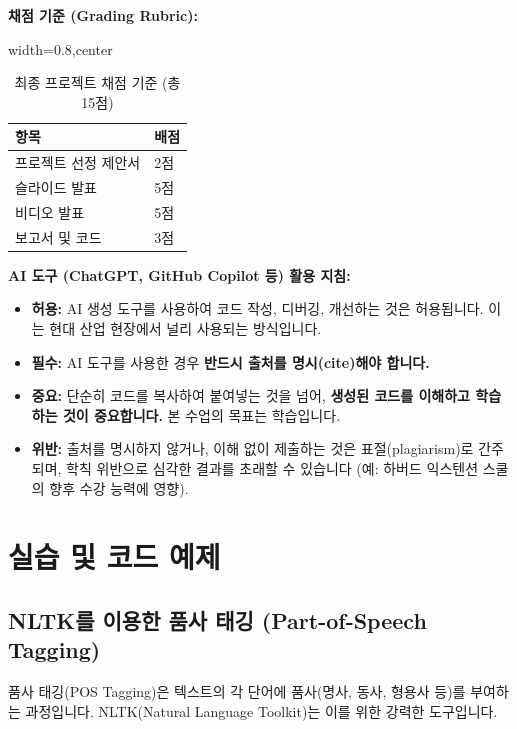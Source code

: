 \documentclass[11pt,a4paper]{article}
\begin{document}
\textbf{채점 기준 (Grading Rubric):}
\begin{table}[h!]
\caption{최종 프로젝트 채점 기준 (총 15점)}
\label{tab:project_rubric}
\centering
\begin{adjustbox}{width=0.8\textwidth,center}
\begin{tabular}{ll}
\toprule
\textbf{항목} & \textbf{배점} \\
\midrule
프로젝트 선정 제안서 & 2점 \\
슬라이드 발표 & 5점 \\
비디오 발표 & 5점 \\
보고서 및 코드 & 3점 \\
\bottomrule
\end{tabular}
\end{adjustbox}
\end{table}

\textbf{AI 도구 (ChatGPT, GitHub Copilot 등) 활용 지침:}
\begin{itemize}
    \item \textbf{허용:} AI 생성 도구를 사용하여 코드 작성, 디버깅, 개선하는 것은 허용됩니다. 이는 현대 산업 현장에서 널리 사용되는 방식입니다.
    \item \textbf{필수:} AI 도구를 사용한 경우 \textbf{반드시 출처를 명시(cite)해야 합니다.}
    \item \textbf{중요:} 단순히 코드를 복사하여 붙여넣는 것을 넘어, \textbf{생성된 코드를 이해하고 학습하는 것이 중요합니다.} 본 수업의 목표는 학습입니다.
    \item \textbf{위반:} 출처를 명시하지 않거나, 이해 없이 제출하는 것은 표절(plagiarism)로 간주되며, 학칙 위반으로 심각한 결과를 초래할 수 있습니다 (예: 하버드 익스텐션 스쿨의 향후 수강 능력에 영향).
\end{itemize}

\newpage
\section*{실습 및 코드 예제}

\subsection{NLTK를 이용한 품사 태깅 (Part-of-Speech Tagging)}
품사 태깅(POS Tagging)은 텍스트의 각 단어에 품사(명사, 동사, 형용사 등)를 부여하는 과정입니다. NLTK(Natural Language Toolkit)는 이를 위한 강력한 도구입니다.
\end{document}
